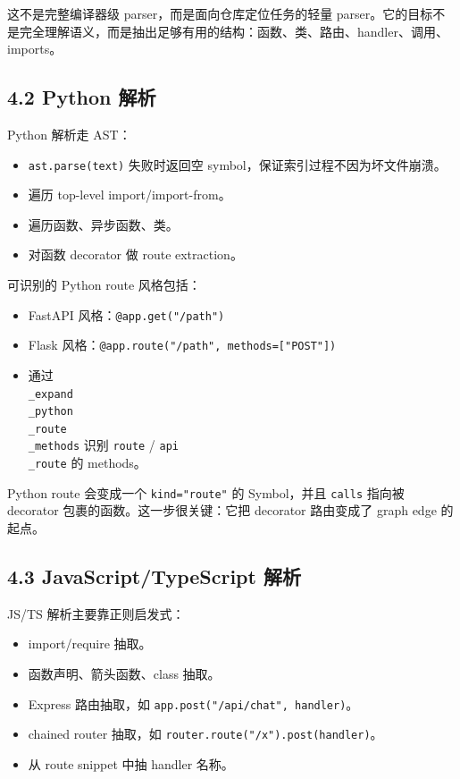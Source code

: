 \documentclass[UTF8,12pt,openany]{ctexbook}
\begin{document}
这不是完整编译器级 parser，而是面向仓库定位任务的轻量 parser。它的目标不是完全理解语义，而是抽出足够有用的结构：函数、类、路由、handler、调用、imports。\par

\subsection{4.2 Python 解析}

Python 解析走 AST：\par

\begin{itemize}
\item \texttt{ast.parse(text)} 失败时返回空 symbol，保证索引过程不因为坏文件崩溃。
\item 遍历 top-level import/import-from。
\item 遍历函数、异步函数、类。
\item 对函数 decorator 做 route extraction。
\end{itemize}

可识别的 Python route 风格包括：\par

\begin{itemize}
\item FastAPI 风格：\texttt{@app.get("/path")}
\item Flask 风格：\texttt{@app.route("/path", methods=["POST"])}
\item 通过 \texttt{\\_expand\\_python\\_route\\_methods} 识别 \texttt{route} / \texttt{api\\_route} 的 methods。
\end{itemize}

Python route 会变成一个 \texttt{kind="route"} 的 Symbol，并且 \texttt{calls} 指向被 decorator 包裹的函数。这一步很关键：它把 decorator 路由变成了 graph edge 的起点。\par

\subsection{4.3 JavaScript/TypeScript 解析}

JS/TS 解析主要靠正则启发式：\par

\begin{itemize}
\item import/require 抽取。
\item 函数声明、箭头函数、class 抽取。
\item Express 路由抽取，如 \texttt{app.post("/api/chat", handler)}。
\item chained router 抽取，如 \texttt{router.route("/x").post(handler)}。
\item 从 route snippet 中抽 handler 名称。
\end{itemize}
\end{document}
